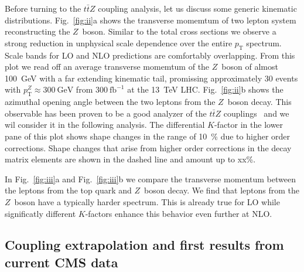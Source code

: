 \documentclass[preprint]{JHEP3}
\newcommand{\GeV}{\mathrm{GeV}}
\newcommand{\pT}{p_{\mathrm{T}}}
\def\ttbZ{t\bar{t}Z}
\begin{document}
Before turning to the $\ttbZ$ coupling analysis, let us discuss some generic kinematic distributions.
Fig.~\ref{fig:ii}a shows the transverse momemtum of two lepton system reconstructing the $Z$~boson.
Similar to the total cross sections we observe a strong reduction in unphysical scale dependence over the entire $\pT$ spectrum.
Scale bands for LO and NLO predictions are comfortably overlapping. 
From this plot we read off an average transverse momemtum of the $Z$~boson of almost 100~GeV with a far extending kinematic tail,
promissing approximately 30 events with $\pT^Z \approx 300~\GeV$ from $300~\mathrm{fb}^{-1}$ at the 13~TeV LHC. 
Fig.~\ref{fig:ii}b shows the azimuthal opening angle between the two leptons from the $Z$~boson decay.
This observable has been proven to be a good analyzer of the $\ttbZ$ couplings~\cite{Baur:2004uw} and we wil consider it in the following analysis.
The differential $K$-factor in the lower pane of this plot shows shape changes in the range of 10~\% due to higher order corrections.
Shape changes that arise from higher order corrections in the decay matrix elements are shown in the dashed line and amount up to xx\%.



In Fig.~\ref{fig:iii}a and Fig.~\ref{fig:iii}b we compare the transverse momentum between the leptons from the top quark and $Z$~boson decay.
We find that leptons from the $Z$~boson have a typically harder spectrum. 
This is already true for LO while significatly different $K$-factors enhance this behavior even further at NLO.

\subsection{Coupling extrapolation and first results from current CMS data}
\label{sect:CMS}
\end{document}

